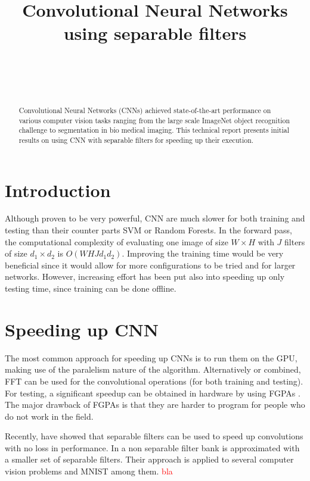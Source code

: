 \documentclass{article} %
\title{Convolutional Neural Networks using separable filters}
\author{
\fontsize{8}{8}\selectfont{Petrescu Viviana}\\
\fontsize{8}{8}\selectfont{EPFL} \\
\fontsize{8}{8}\selectfont{\texttt{viviana.petrescu@epfl.ch}} \\
}
\begin{document}
\maketitle

\begin{abstract}
Convolutional Neural Networks (CNNs) achieved state-of-the-art performance on various computer vision tasks ranging from the large scale ImageNet object recognition challenge to segmentation in bio medical imaging.
This technical report presents initial results on using CNN with separable filters for speeding up their execution.
\end{abstract}

\section{Introduction}
Although proven to be very powerful, CNN are much slower for both training and testing than their counter parts SVM or Random Forests.
In the forward pass, the computational complexity of evaluating one image of size $W\times H$ with $J$ filters of size $d_{1}\times d_{2}$ is $O(WHJd_{1}d_{2})$.
Improving the training time would be very beneficial since it would allow for more configurations to be tried and for larger networks. However, increasing effort has been put also into speeding up only testing time, since training can be done offline.

\section{Speeding up CNN}
The most common approach for speeding up CNNs is to run them on the GPU, making use of the paralelism nature of the algorithm. Alternatively or combined, FFT can be used for the convolutional operations (for  both training and testing)\cite{DBLP:journals/corr/MathieuHL13}.  For testing, a significant speedup can be obtained in hardware by using FGPAs \citep{lecun2010convolutional}. The major drawback of FGPAs is that they are harder to program for people who do not work in the field.

Recently,\citep{Jaderberg14b}  \citep{DBLP:dblp_journals/pami/SironiTRLF15} have showed that separable filters can be used to speed up convolutions with no loss in performance.
In \citep{DBLP:dblp_journals/pami/SironiTRLF15} a non separable filter bank is approximated with a smaller set of separable filters. Their approach is applied to several computer vision problems and MNIST among them. \textcolor{red}{bla} 
\end{document}
